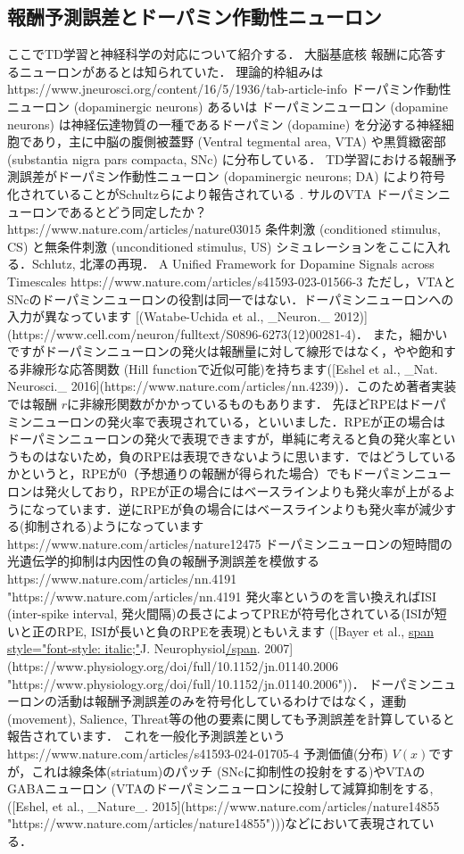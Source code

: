 \subsection{報酬予測誤差とドーパミン作動性ニューロン}
ここでTD学習と神経科学の対応について紹介する．
大脳基底核
報酬に応答するニューロンがあるとは知られていた．
理論的枠組みは
https://www.jneurosci.org/content/16/5/1936/tab-article-info
ドーパミン作動性ニューロン (dopaminergic neurons) あるいは ドーパミンニューロン (dopamine neurons) は神経伝達物質の一種であるドーパミン (dopamine) を分泌する神経細胞であり，主に中脳の腹側被蓋野 (Ventral tegmental area, VTA) や黒質緻密部 (substantia nigra pars compacta, SNc) に分布している．
TD学習における報酬予測誤差がドーパミン作動性ニューロン (dopaminergic neurons; DA) により符号化されていることがSchultzらにより報告されている \citep{Schultz1997-ih}. 
サルのVTA
ドーパミンニューロンであるとどう同定したか？
https://www.nature.com/articles/nature03015
条件刺激 (conditioned stimulus, CS) と無条件刺激 (unconditioned stimulus, US)
シミュレーションをここに入れる．Schlutz, 
北澤の再現．
A Unified Framework for Dopamine Signals across Timescales
https://www.nature.com/articles/s41593-023-01566-3
ただし，VTAとSNcのドーパミンニューロンの役割は同一ではない．ドーパミンニューロンへの入力が異なっています [(Watabe-Uchida et al., _Neuron._ 2012)](https://www.cell.com/neuron/fulltext/S0896-6273(12)00281-4)． また，細かいですがドーパミンニューロンの発火は報酬量に対して線形ではなく，やや飽和する非線形な応答関数 (Hill functionで近似可能)を持ちます([Eshel et al., _Nat. Neurosci._ 2016](https://www.nature.com/articles/nn.4239))．このため著者実装では報酬 $r$に非線形関数がかかっているものもあります．
先ほどRPEはドーパミンニューロンの発火率で表現されている，といいました．RPEが正の場合はドーパミンニューロンの発火で表現できますが，単純に考えると負の発火率というものはないため，負のRPEは表現できないように思います．ではどうしているかというと，RPEが0（予想通りの報酬が得られた場合）でもドーパミンニューロンは発火しており，RPEが正の場合にはベースラインよりも発火率が上がるようになっています．逆にRPEが負の場合にはベースラインよりも発火率が減少する(抑制される)ようになっています
https://www.nature.com/articles/nature12475
ドーパミンニューロンの短時間の光遺伝学的抑制は内因性の負の報酬予測誤差を模倣する
https://www.nature.com/articles/nn.4191 "https://www.nature.com/articles/nn.4191
発火率というのを言い換えればISI (inter-spike interval, 発火間隔)の長さによってPREが符号化されている(ISIが短いと正のRPE, ISIが長いと負のRPEを表現)ともいえます ([Bayer et al., \url{span style="font-style: italic;"}J.
Neurophysiol\url{/span}. 2007](https://www.physiology.org/doi/full/10.1152/jn.01140.2006 "https://www.physiology.org/doi/full/10.1152/jn.01140.2006"))．
ドーパミンニューロンの活動は報酬予測誤差のみを符号化しているわけではなく，運動 (movement), Salience, Threat等の他の要素に関しても予測誤差を計算していると報告されています．
これを一般化予測誤差という
https://www.nature.com/articles/s41593-024-01705-4
予測価値(分布) $V(x)$ですが，これは線条体(striatum)のパッチ (SNcに抑制性の投射をする)やVTAのGABAニューロン (VTAのドーパミンニューロンに投射して減算抑制をする, ([Eshel, et al., _Nature_. 2015](https://www.nature.com/articles/nature14855 "https://www.nature.com/articles/nature14855")))などにおいて表現されている．
